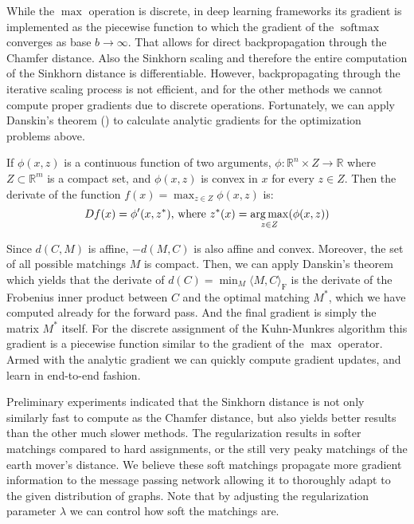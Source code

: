 While the $\max$ operation is discrete, in deep learning frameworks its gradient is implemented as the piecewise function to which the gradient of the $\operatorname{softmax}$ converges as base $b \to \infty$. That allows for direct backpropagation through the Chamfer distance. Also the Sinkhorn scaling and therefore the entire computation of the Sinkhorn distance is differentiable. However, backpropagating through the iterative scaling process is not efficient, and for the other methods we cannot compute proper gradients due to discrete operations. Fortunately, we can apply Danskin's theorem (\citealp{danskin1967}) to calculate analytic gradients for the optimization problems above.
\begin{theorem}
     If $\phi(x,z)$ is a continuous function of two arguments, $\phi: {\mathbb R}^n \times Z \rightarrow {\mathbb R}$ where $Z \subset {\mathbb R}^m$ is a compact set, and  $\phi(x,z)$ is convex in $x$ for every $z \in Z$.
     Then the derivate of the function $f(x) = \max_{z \in Z} \phi(x,z)$ is:
     \begin{equation}
          D f(x) = \phi'(x,z^*)  \text{, where } z^*(x) = \operatorname*{arg\,max}_{z \in Z}(\phi(x,z))
     \end{equation}
\end{theorem}
Since $d(C, M)$ is affine, $-d(M,C)$ is also affine and convex. Moreover, the set of all possible matchings $M$ is compact. Then, we can apply Danskin's theorem which yields that the derivate of $d(C) = \min_M \langle M, C \rangle_\mathrm{F}$ is the derivate of the Frobenius inner product between $C$ and the optimal matching $M^*$, which we have computed already for the forward pass. And the final gradient is simply the matrix $M^*$ itself. For the discrete assignment of the Kuhn-Munkres algorithm this gradient is a piecewise function similar to the gradient of the $\max$ operator. Armed with the analytic gradient we can quickly compute gradient updates, and learn in end-to-end fashion.

Preliminary experiments indicated that the Sinkhorn distance is not only similarly fast to compute as the Chamfer distance, but also yields better results than the other much slower methods. The regularization results in softer matchings compared to hard assignments, or the still very peaky matchings of the earth mover's distance. We believe these soft matchings propagate more gradient information to the message passing network allowing it to thoroughly adapt to the given distribution of graphs. Note that by adjusting the regularization parameter $\lambda$ we can control how soft the matchings are.

